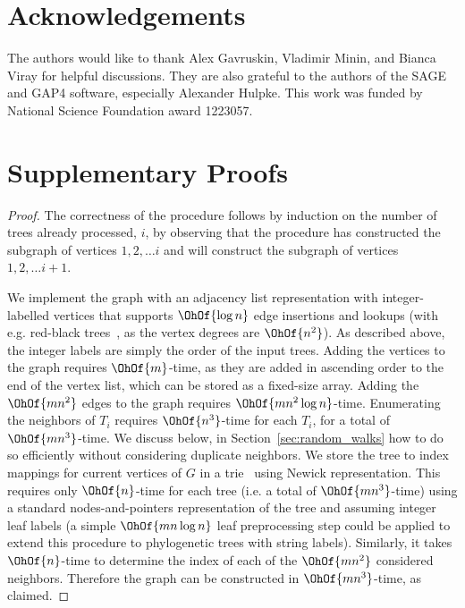 \documentclass[11pt,onecolumn,conference]{IEEEtran}
\begin{document}
\section{Acknowledgements}
The authors would like to thank Alex Gavruskin, Vladimir Minin, and Bianca Viray for helpful discussions.
They are also grateful to the authors of the SAGE and GAP4 software, especially Alexander Hulpke.
This work was funded by National Science Foundation award 1223057.

\pagebreak




\pagebreak

\appendices

\section{Supplementary Proofs}

\constructgraph*
\begin{proof}
	The correctness of the procedure follows by induction on the number of trees already processed, $i$, by observing that the procedure has constructed the subgraph of vertices $1, 2,  \ldots i$ and will construct the subgraph of vertices $1, 2, \ldots i+1$.

	We implement the graph with an adjacency list representation with integer-labelled vertices that supports $\OhOf{\log n}$ edge insertions and lookups (with e.g. red-black trees~\cite{guibas1978dichromatic}, as the vertex degrees are $\OhOf{n^2}$).
	As described above, the integer labels are simply the order of the input trees.
	Adding the vertices to the graph requires $\OhOf{m}$-time, as they are added in ascending order to the end of the vertex list, which can be stored as a fixed-size array.
	Adding the $\OhOf{mn^2}$ edges to the graph requires $\OhOf{mn^2 \log n}$-time.
	Enumerating the neighbors of $T_i$ requires $\OhOf{n^3}$-time for each $T_i$, for a total of $\OhOf{mn^3}$-time.
	We discuss below, in Section~\ref{sec:random_walks} how to do so efficiently without considering duplicate neighbors.
	We store the tree to index mappings for current vertices of $G$ in a trie~\cite{fredkin1960trie} using Newick representation.
	This requires only $\OhOf{n}$-time for each tree (i.e. a total of $\OhOf{mn^3}$-time) using a standard nodes-and-pointers representation of the tree and assuming integer leaf labels (a simple $\OhOf{mn\log n}$ leaf preprocessing step could be applied to extend this procedure to phylogenetic trees with string labels).
	Similarly, it takes $\OhOf{n}$-time to determine the index of each of the $\OhOf{mn^2}$ considered neighbors.
	Therefore the graph can be constructed in $\OhOf{mn^3}$-time, as claimed.
\end{proof}
\end{document}
